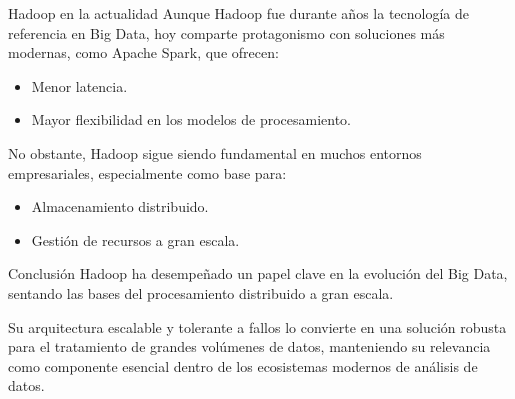 \documentclass{beamer}
\begin{document}
\begin{frame}{Hadoop en la actualidad}
Aunque Hadoop fue durante años la tecnología de referencia en Big Data, hoy comparte protagonismo con soluciones más modernas, como Apache Spark, que ofrecen:
\begin{itemize}
    \item Menor latencia.
    \item Mayor flexibilidad en los modelos de procesamiento.
\end{itemize}

No obstante, Hadoop sigue siendo fundamental en muchos entornos empresariales, especialmente como base para:
\begin{itemize}
    \item Almacenamiento distribuido.
    \item Gestión de recursos a gran escala.
\end{itemize}
\end{frame}

\begin{frame}{Conclusión}
Hadoop ha desempeñado un papel clave en la evolución del Big Data, sentando las bases del procesamiento distribuido a gran escala.

Su arquitectura escalable y tolerante a fallos lo convierte en una solución robusta para el tratamiento de grandes volúmenes de datos, manteniendo su relevancia como componente esencial dentro de los ecosistemas modernos de análisis de datos.
\end{frame}
\end{document}
